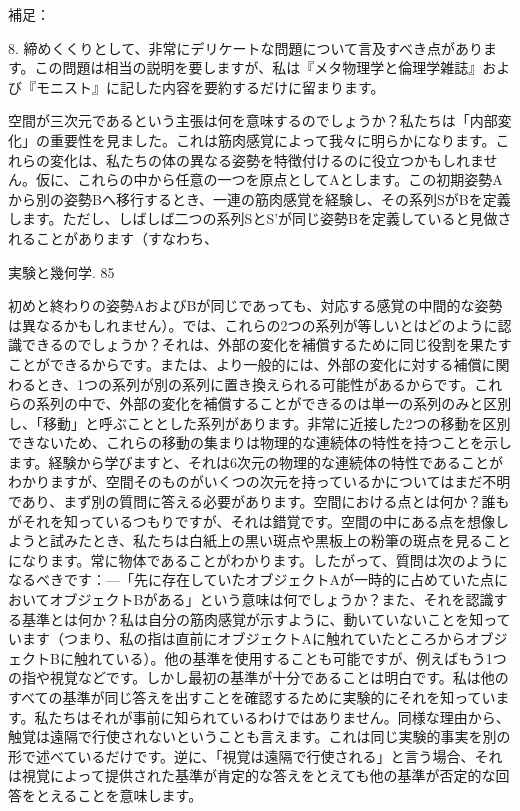 \documentclass[a4paper,11pt,openany]{ltjsbook}
\begin{document}
補足：

8. 締めくくりとして、非常にデリケートな問題について言及すべき点があります。この問題は相当の説明を要しますが、私は『メタ物理学と倫理学雑誌』および『モニスト』に記した内容を要約するだけに留まります。

空間が三次元であるという主張は何を意味するのでしょうか？私たちは「内部変化」の重要性を見ました。これは筋肉感覚によって我々に明らかになります。これらの変化は、私たちの体の異なる姿勢を特徴付けるのに役立つかもしれません。仮に、これらの中から任意の一つを原点としてAとします。この初期姿勢Aから別の姿勢Bへ移行するとき、一連の筋肉感覚を経験し、その系列SがBを定義します。ただし、しばしば二つの系列SとS'が同じ姿勢Bを定義していると見做されることがあります（すなわち、

実験と幾何学. 85

初めと終わりの姿勢AおよびBが同じであっても、対応する感覚の中間的な姿勢は異なるかもしれません）。では、これらの2つの系列が等しいとはどのように認識できるのでしょうか？それは、外部の変化を補償するために同じ役割を果たすことができるからです。または、より一般的には、外部の変化に対する補償に関わるとき、1つの系列が別の系列に置き換えられる可能性があるからです。これらの系列の中で、外部の変化を補償することができるのは単一の系列のみと区別し、「移動」と呼ぶこととした系列があります。非常に近接した2つの移動を区別できないため、これらの移動の集まりは物理的な連続体の特性を持つことを示します。経験から学びますと、それは6次元の物理的な連続体の特性であることがわかりますが、空間そのものがいくつの次元を持っているかについてはまだ不明であり、まず別の質問に答える必要があります。空間における点とは何か？誰もがそれを知っているつもりですが、それは錯覚です。空間の中にある点を想像しようと試みたとき、私たちは白紙上の黒い斑点や黒板上の粉筆の斑点を見ることになります。常に物体であることがわかります。したがって、質問は次のようになるべきです：—「先に存在していたオブジェクトAが一時的に占めていた点においてオブジェクトBがある」という意味は何でしょうか？また、それを認識する基準とは何か？私は自分の筋肉感覚が示すように、動いていないことを知っています（つまり、私の指は直前にオブジェクトAに触れていたところからオブジェクトBに触れている）。他の基準を使用することも可能ですが、例えばもう1つの指や視覚などです。しかし最初の基準が十分であることは明白です。私は他のすべての基準が同じ答えを出すことを確認するために実験的にそれを知っています。私たちはそれが事前に知られているわけではありません。同様な理由から、触覚は遠隔で行使されないということも言えます。これは同じ実験的事実を別の形で述べているだけです。逆に、「視覚は遠隔で行使される」と言う場合、それは視覚によって提供された基準が肯定的な答えをとえても他の基準が否定的な回答をとえることを意味します。
\end{document}

